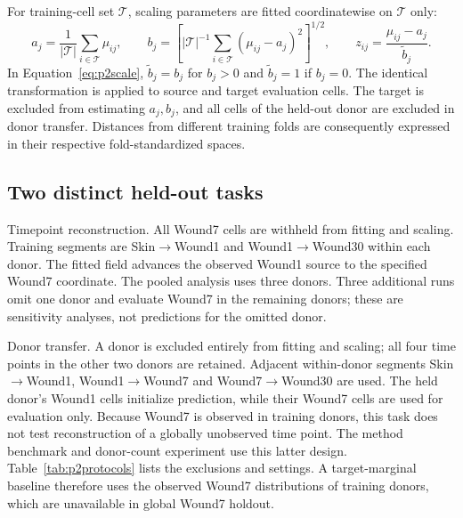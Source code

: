 \documentclass[10pt,a4paper]{article}
\begin{document}
For training-cell set $\mathcal T$, scaling parameters are fitted coordinatewise on $\mathcal T$ only:
\begin{equation}
a_j=\frac1{|\mathcal T|}\sum_{i\in\mathcal T}\mu_{ij},\qquad
b_j=\left[|\mathcal T|^{-1}\sum_{i\in\mathcal T}(\mu_{ij}-a_j)^2\right]^{1/2},\qquad
z_{ij}=\frac{\mu_{ij}-a_j}{\widetilde b_j}.\label{eq:p2scale}
\end{equation}
In Equation~\eqref{eq:p2scale}, $\widetilde b_j=b_j$ for $b_j>0$ and $\widetilde b_j=1$ if $b_j=0$. The identical transformation is applied to source and target evaluation cells. The target is excluded from estimating $a_j,b_j$, and all cells of the held-out donor are excluded in donor transfer. Distances from different training folds are consequently expressed in their respective fold-standardized spaces.

\subsection{Two distinct held-out tasks}
Timepoint reconstruction. All Wound7 cells are withheld from fitting and scaling. Training segments are Skin$\rightarrow$Wound1 and Wound1$\rightarrow$Wound30 within each donor. The fitted field advances the observed Wound1 source to the specified Wound7 coordinate. The pooled analysis uses three donors. Three additional runs omit one donor and evaluate Wound7 in the remaining donors; these are sensitivity analyses, not predictions for the omitted donor.

Donor transfer. A donor is excluded entirely from fitting and scaling; all four time points in the other two donors are retained. Adjacent within-donor segments Skin$\rightarrow$Wound1, Wound1$\rightarrow$Wound7 and Wound7$\rightarrow$Wound30 are used. The held donor's Wound1 cells initialize prediction, while their Wound7 cells are used for evaluation only. Because Wound7 is observed in training donors, this task does not test reconstruction of a globally unobserved time point. The method benchmark and donor-count experiment use this latter design. Table~\ref{tab:p2protocols} lists the exclusions and settings. A target-marginal baseline therefore uses the observed Wound7 distributions of training donors, which are unavailable in global Wound7 holdout.
\end{document}
